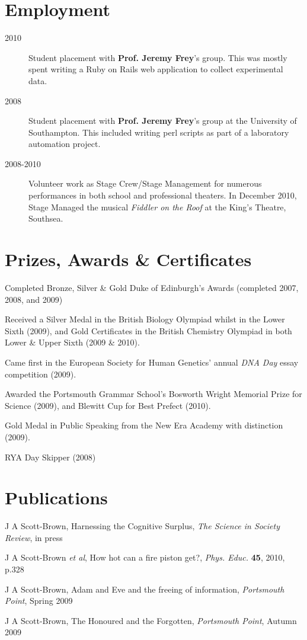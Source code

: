 \documentclass[letterpaper]{article}
\renewenvironment{itemize}{
  \begin{list}{}{
    \setlength{\leftmargin}{1.5em}
  }
}{
  \end{list}
}
\begin{document}
\section*{Employment}
\begin{description}
	\item[2010] Student placement with {\bf Prof. Jeremy Frey}'s group. This was mostly spent writing a Ruby on Rails web application to collect experimental data. 
	\item[2008] Student placement with {\bf Prof. Jeremy Frey}'s group at the University of Southampton. This included writing perl scripts as part of a laboratory automation project.
	\item[2008-2010] Volunteer work as Stage Crew/Stage Management for numerous performances in both school and professional theaters. In December 2010, Stage Managed the musical \textit{Fiddler on the Roof} at the King's Theatre, Southsea.
\end{description}

\section*{Prizes, Awards \& Certificates}
\begin{itemize}
	\item Completed Bronze, Silver \& Gold Duke of Edinburgh's Awards (completed 2007, 2008, and 2009)
	\item Received a Silver Medal in the British Biology Olympiad whilst in the Lower Sixth (2009), and Gold Certificates in the British Chemistry Olympiad in both Lower \& Upper Sixth (2009 \& 2010). 
	\item Came first in the European Society for Human Genetics' annual \textit{DNA Day} essay competition (2009). 
	\item Awarded the Portsmouth Grammar School's Bosworth Wright Memorial Prize for Science (2009), and Blewitt Cup for Best Prefect (2010).
 	\item Gold Medal in Public Speaking from the New Era Academy with distinction (2009).
	\item RYA Day Skipper (2008)
\end{itemize}

\section*{Publications}
\begin{itemize}
\item J A Scott-Brown, Harnessing the Cognitive Surplus, \textit{The Science in Society Review}, in press
\item J A Scott-Brown \textit{et al}, How hot can a fire piston get?, \textit{Phys. Educ.} {\bf 45}, 2010, p.328
\item J A Scott-Brown, Adam and Eve and the freeing of information, \textit{Portsmouth Point}, Spring 2009
\item J A Scott-Brown, The Honoured and the Forgotten, \textit{Portsmouth Point}, Autumn 2009
\end{itemize}
\end{document}
